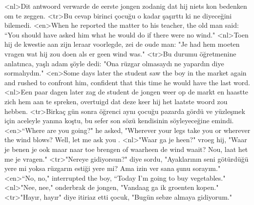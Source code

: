 <nl>Dit antwoord verwarde de eerste jongen zodanig dat hij niets kon bedenken om te zeggen.
<tr>Bu cevap birinci çocuğu o kadar şaşırttı ki ne diyeceğini bilemedi.
<en>When he reported the matter to his teacher, the old man said: “You should have asked him what he would do if there were no wind."
<nl>Toen hij de kwestie aan zijn leraar voorlegde, zei de oude man: "Je had hem moeten vragen wat hij zou doen als er geen wind was."
<tr>Bu durumu öğretmenine anlatınca, yaşlı adam şöyle dedi: "Ona rüzgar olmasaydı ne yapardın diye sormalıydın."
<en>Some days later the student saw the boy in the market again and rushed to confront him, confident that this time he would have the last word.
<nl>Een paar dagen later zag de student de jongen weer op de markt en haastte zich hem aan te spreken,  overtuigd dat deze keer hij het laatste woord zou hebben.
<tr>Birkaç gün sonra öğrenci aynı çocuğu pazarda gördü ve yüzleşmek için aceleyle yanına koştu, bu sefer son sözü kendisinin söyleyeceğine emindi.
<en>“Where are you going?" he asked,  "Wherever your legs take you or wherever the wind blows? Well, let me ask you .
<nl>"Waar ga je heen?" vroeg hij,  "Waar je benen je ook maar naar toe  brengen of waarheen de wind waait? Nou, laat het me je vragen."
<tr>"Nereye gidiyorsun?" diye sordu, "Ayaklarının seni götürdüğü yere mi yoksa rüzgarın estiği yere mi? Ama izin ver sana şunu sorayım."
<en>“No, no," interrupted the boy,  “Today I’m going to buy vegetables."
<nl>"Nee, nee," onderbrak de jongen, "Vandaag ga ik groenten kopen."
<tr>"Hayır, hayır" diye itiriaz etti çocuk, "Bugün sebze almaya gidiyorum."
